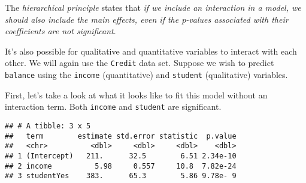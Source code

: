 \documentclass[]{book}
\newenvironment{Shaded}{\begin{snugshade}}{\end{snugshade}}
\newcommand{\DataTypeTok}[1]{\textcolor[rgb]{0.13,0.29,0.53}{#1}}
\newcommand{\DecValTok}[1]{\textcolor[rgb]{0.00,0.00,0.81}{#1}}
\newcommand{\FloatTok}[1]{\textcolor[rgb]{0.00,0.00,0.81}{#1}}
\newcommand{\KeywordTok}[1]{\textcolor[rgb]{0.13,0.29,0.53}{\textbf{#1}}}
\newcommand{\NormalTok}[1]{#1}
\newcommand{\OperatorTok}[1]{\textcolor[rgb]{0.81,0.36,0.00}{\textbf{#1}}}
\newcommand{\StringTok}[1]{\textcolor[rgb]{0.31,0.60,0.02}{#1}}
\begin{document}
The \emph{hierarchical principle} states that \emph{if we include an interaction in a model, we should also include the main effects, even if the p-values associated with their coefficients are not significant}.

It's also possible for qualitative and quantitative variables to interact with each other. We will again use the \texttt{Credit} data set. Suppose we wish to predict \texttt{balance} using the \texttt{income} (quantitative) and \texttt{student} (qualitative) variables.

First, let's take a look at what it looks like to fit this model without an interaction term. Both \texttt{income} and \texttt{student} are significant.

\begin{Shaded}
\end{Shaded}

\begin{verbatim}
## # A tibble: 3 x 5
##   term        estimate std.error statistic  p.value
##   <chr>          <dbl>     <dbl>     <dbl>    <dbl>
## 1 (Intercept)   211.      32.5        6.51 2.34e-10
## 2 income          5.98     0.557     10.8  7.82e-24
## 3 studentYes    383.      65.3        5.86 9.78e- 9
\end{verbatim}

\begin{Shaded}
\end{Shaded}
\end{document}
